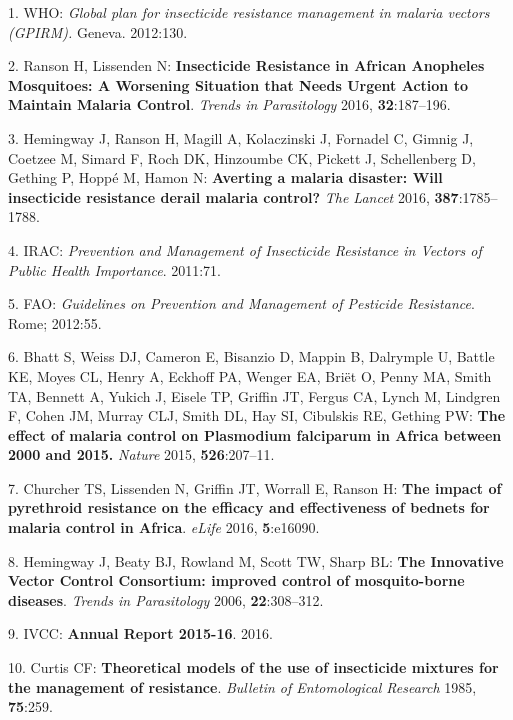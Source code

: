 \documentclass[11pt,]{article}
\begin{document}
\hypertarget{refs}{}
\hypertarget{ref-WHO2012}{}
1. WHO: \emph{Global plan for insecticide resistance management in
malaria vectors (GPIRM).} Geneva. 2012:130.

\hypertarget{ref-Ranson2016}{}
2. Ranson H, Lissenden N: \textbf{Insecticide Resistance in African
Anopheles Mosquitoes: A Worsening Situation that Needs Urgent Action to
Maintain Malaria Control}. \emph{Trends in Parasitology} 2016,
\textbf{32}:187--196.

\hypertarget{ref-Hemingway2016}{}
3. Hemingway J, Ranson H, Magill A, Kolaczinski J, Fornadel C, Gimnig J,
Coetzee M, Simard F, Roch DK, Hinzoumbe CK, Pickett J, Schellenberg D,
Gething P, Hoppé M, Hamon N: \textbf{Averting a malaria disaster: Will
insecticide resistance derail malaria control?} \emph{The Lancet} 2016,
\textbf{387}:1785--1788.

\hypertarget{ref-IRAC2011}{}
4. IRAC: \emph{Prevention and Management of Insecticide Resistance in
Vectors of Public Health Importance}. 2011:71.

\hypertarget{ref-FAO2012}{}
5. FAO: \emph{Guidelines on Prevention and Management of Pesticide
Resistance}. Rome; 2012:55.

\hypertarget{ref-Bhatt2015}{}
6. Bhatt S, Weiss DJ, Cameron E, Bisanzio D, Mappin B, Dalrymple U,
Battle KE, Moyes CL, Henry A, Eckhoff PA, Wenger EA, Briët O, Penny MA,
Smith TA, Bennett A, Yukich J, Eisele TP, Griffin JT, Fergus CA, Lynch
M, Lindgren F, Cohen JM, Murray CLJ, Smith DL, Hay SI, Cibulskis RE,
Gething PW: \textbf{The effect of malaria control on Plasmodium
falciparum in Africa between 2000 and 2015.} \emph{Nature} 2015,
\textbf{526}:207--11.

\hypertarget{ref-Churcher2016}{}
7. Churcher TS, Lissenden N, Griffin JT, Worrall E, Ranson H:
\textbf{The impact of pyrethroid resistance on the efficacy and
effectiveness of bednets for malaria control in Africa}. \emph{eLife}
2016, \textbf{5}:e16090.

\hypertarget{ref-Hemingway2006}{}
8. Hemingway J, Beaty BJ, Rowland M, Scott TW, Sharp BL: \textbf{The
Innovative Vector Control Consortium: improved control of mosquito-borne
diseases}. \emph{Trends in Parasitology} 2006, \textbf{22}:308--312.

\hypertarget{ref-IVCC2016}{}
9. IVCC: \textbf{Annual Report 2015-16}. 2016.

\hypertarget{ref-Curtis1985}{}
10. Curtis CF: \textbf{Theoretical models of the use of insecticide
mixtures for the management of resistance}. \emph{Bulletin of
Entomological Research} 1985, \textbf{75}:259.
\end{document}

